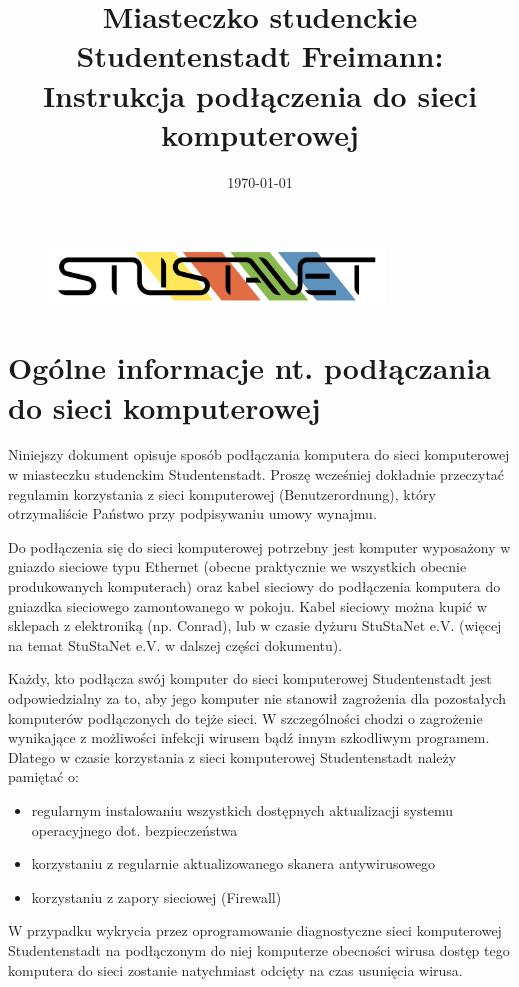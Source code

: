 \documentclass[a4paper,12pt]{scrartcl}
\title{Miasteczko studenckie Studentenstadt Freimann:\\
       Instrukcja podłączenia do sieci komputerowej}
\date{\today}
\begin{document}
\maketitle

\begin{figure}[t!]
   \centering
   \vspace{-20pt}
   \includegraphics[width=0.8\textwidth,keepaspectratio]{Bilder/StuStaNet_Logo}
   \vspace{-20pt}
\end{figure}

\section*{Ogólne informacje nt. podłączania do sieci komputerowej}

Niniejszy dokument opisuje sposób podłączania komputera do sieci komputerowej w miasteczku studenckim Studentenstadt. Proszę wcześniej dokładnie przeczytać regulamin korzystania z sieci komputerowej (Benutzerordnung), który otrzymaliście Państwo przy podpisywaniu umowy wynajmu.

Do podłączenia się do sieci komputerowej potrzebny jest komputer wyposażony w gniazdo sieciowe typu Ethernet (obecne praktycznie we wszystkich obecnie produkowanych komputerach) oraz kabel sieciowy do podłączenia komputera do gniazdka sieciowego zamontowanego w pokoju. Kabel sieciowy można kupić w sklepach z elektroniką (np. Conrad), lub w czasie dyżuru StuStaNet e.V. (więcej na temat StuStaNet e.V. w dalszej części dokumentu).

Każdy, kto podłącza swój komputer do sieci komputerowej Studentenstadt jest odpowiedzialny za to, aby jego komputer nie stanowił zagrożenia dla pozostałych komputerów podłączonych do tejże sieci. W szczególności chodzi o zagrożenie wynikające z możliwości infekcji wirusem bądź innym szkodliwym programem. Dlatego w czasie korzystania z sieci komputerowej Studentenstadt należy pamiętać o:
\begin{itemize}
    \item regularnym instalowaniu wszystkich dostępnych aktualizacji systemu operacyjnego dot. bezpieczeństwa
    \item korzystaniu z regularnie aktualizowanego skanera antywirusowego
    \item korzystaniu z zapory sieciowej (Firewall)
\end{itemize}
W przypadku wykrycia przez oprogramowanie diagnostyczne sieci komputerowej Studentenstadt na podłączonym do niej komputerze obecności wirusa dostęp tego komputera do sieci zostanie natychmiast odcięty na czas usunięcia wirusa.
\end{document}
